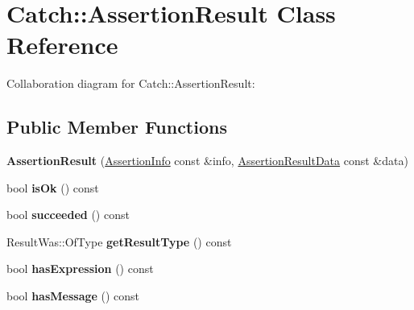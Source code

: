 \hypertarget{class_catch_1_1_assertion_result}{}\section{Catch\+:\+:Assertion\+Result Class Reference}
\label{class_catch_1_1_assertion_result}


Collaboration diagram for Catch\+:\+:Assertion\+Result\+:
\subsection*{Public Member Functions}
\begin{DoxyCompactItemize}
\item 
\mbox{\label{class_catch_1_1_assertion_result_ab58aeec27052ba400633ed0e36cea692}} 
{\bfseries Assertion\+Result} (\hyperlink{struct_catch_1_1_assertion_info}{Assertion\+Info} const \&info, \hyperlink{struct_catch_1_1_assertion_result_data}{Assertion\+Result\+Data} const \&data)
\item 
\mbox{\label{class_catch_1_1_assertion_result_ae39658b71c4afc3c8a859043b0e97027}} 
bool {\bfseries is\+Ok} () const
\item 
\mbox{\label{class_catch_1_1_assertion_result_ac5cc872b721d5fb65d87221d30b22fdd}} 
bool {\bfseries succeeded} () const
\item 
\mbox{\label{class_catch_1_1_assertion_result_ac810750194e1722489d2fd16e8c6a4a8}} 
Result\+Was\+::\+Of\+Type {\bfseries get\+Result\+Type} () const
\item 
\mbox{\label{class_catch_1_1_assertion_result_aba37b4fef1015989df2136592958e984}} 
bool {\bfseries has\+Expression} () const
\item 
\mbox{\label{class_catch_1_1_assertion_result_aae37064b401919fa8ac480ef86cca924}} 
bool {\bfseries has\+Message} () const
\item 
\mbox{\label{class_catch_1_1_assertion_result_a26a777f3959353c729544cb2ace0d279}} 

\end{DoxyCompactItemize}
